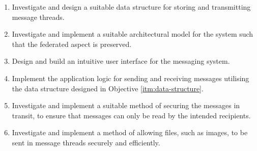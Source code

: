 \begin{enumerate}
  \item \label{itm:data-structure} Investigate and design a suitable data structure for storing and transmitting message threads.
  \item Investigate and implement a suitable architectural model for the system such that the federated aspect is preserved.
  \item Design and build an intuitive user interface for the messaging system.
  \item Implement the application logic for sending and receiving messages utilising the data structure designed in Objective \ref{itm:data-structure}.
  \item Investigate and implement a suitable method of securing the messages in transit, to ensure that messages can only be read by the intended recipients.
  \item Investigate and implement a method of allowing files, such as images, to be sent in message threads securely and efficiently.
\end{enumerate}